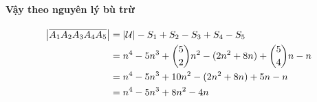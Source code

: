 \documentclass[main.tex]{subfiles}
\begin{document}
\paragraph*{Vậy theo nguyên lý bù trừ} 
\begin{align*}
\left|\overline{A_1A_2A_3A_4A_5}\right| &= \left|\mathcal U\right| - S_1 + S_2 - S_3 + S_4 - S_5\\
&= n^4 - 5n^3 + {5\choose2}n^2-(2n^2+8n)+{5\choose4}n-n\\
&= n^4 - 5n^3 + 10n^2 - (2n^2+8n) + 5n - n\\
&= n^4 - 5n^3 + 8n^2 - 4n
\end{align*}
\end{document}
